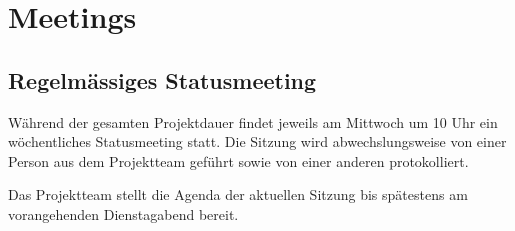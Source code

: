\section{Meetings}
\subsection*{Regelmässiges Statusmeeting}
Während der gesamten Projektdauer findet jeweils am Mittwoch um 10 Uhr ein wöchentliches Statusmeeting statt. Die Sitzung wird abwechslungsweise von einer Person aus dem Projektteam geführt sowie von einer anderen protokolliert.

Das Projektteam stellt die Agenda der aktuellen Sitzung bis spätestens am vorangehenden Dienstagabend bereit.